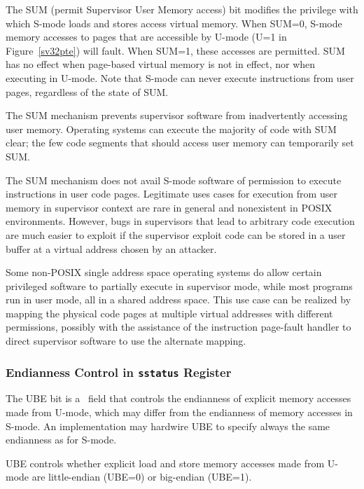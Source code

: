 The SUM (permit Supervisor User Memory access) bit modifies the privilege with
which S-mode loads and stores access virtual memory.
When SUM=0, S-mode memory accesses to pages that are accessible by U-mode (U=1
in Figure~\ref{sv32pte}) will fault.  When SUM=1, these accesses are permitted.
SUM has no effect when page-based virtual memory is not in effect, nor when
executing in U-mode.  Note that S-mode can never execute instructions from user
pages, regardless of the state of SUM.

\begin{commentary}
The SUM mechanism prevents supervisor software from inadvertently accessing
user memory.  Operating systems can execute the majority of code with SUM clear;
the few code segments that should access user memory can temporarily set
SUM.

The SUM mechanism does not avail S-mode software of permission to execute
instructions in user code pages.  Legitimate uses cases for execution from
user memory in supervisor context are rare in general and nonexistent in POSIX
environments.  However, bugs in supervisors that lead to arbitrary code
execution are much easier to exploit if the supervisor exploit code can be
stored in a user buffer at a virtual address chosen by an attacker.

Some non-POSIX single address space operating systems do allow certain
privileged software to partially execute in supervisor mode, while most
programs run in user mode, all in a shared address space.  This use case can
be realized by mapping the physical code pages at multiple virtual addresses
with different permissions, possibly with the assistance of the
instruction page-fault handler to direct supervisor software to use the
alternate mapping.
\end{commentary}

\subsubsection{Endianness Control in {\tt sstatus} Register}

The UBE bit is a \warl\ field that controls the endianness of explicit
memory accesses made from U-mode, which may differ from the endianness of
memory accesses in S-mode.
An implementation may hardwire UBE to specify always the same endianness
as for S-mode.

UBE controls whether explicit
load and store memory accesses made from U-mode are little-endian (UBE=0)
or big-endian (UBE=1).

